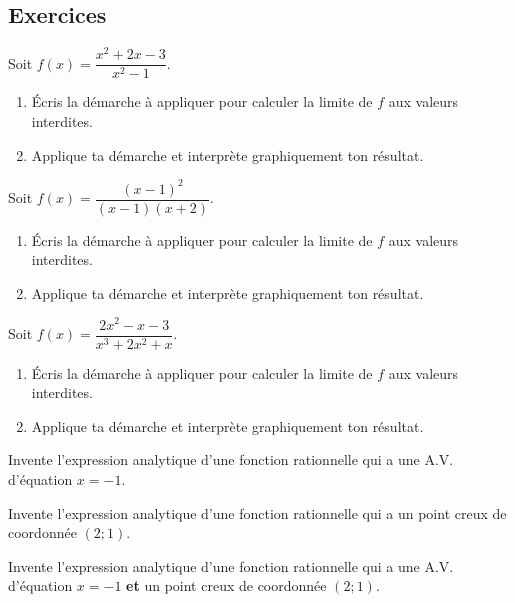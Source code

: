 \documentclass[a4paper,12pt]{report}
\begin{document}
\subsection{Exercices}
\label{sec:org7459f33}
\begin{exercice}
Soit \(f(x)=\dfrac{x^2+2x-3}{x^2-1}\).
\begin{enumerate}
\item Écris la démarche à appliquer pour calculer la limite de \(f\) aux
valeurs interdites.
\item Applique ta démarche et interprète graphiquement ton résultat.
\end{enumerate}
\label{orgfd57650}
\end{exercice}

\begin{exercice}
Soit \(f(x)=\dfrac{(x-1)^2}{(x-1)(x+2)}\).
\begin{enumerate}
\item Écris la démarche à appliquer pour calculer la limite de \(f\) aux
valeurs interdites.
\item Applique ta démarche et interprète graphiquement ton résultat.
\end{enumerate}
\label{org8c9e388}
\end{exercice}
\begin{exercice}
Soit \(f(x)=\dfrac{2x^2-x-3}{x^3+2x^2+x}\).
\begin{enumerate}
\item Écris la démarche à appliquer pour calculer la limite de \(f\) aux
valeurs interdites.
\item Applique ta démarche et interprète graphiquement ton résultat.
\end{enumerate}
\label{org43c2d77}
\end{exercice}
\begin{exercice}
Invente l'expression analytique d'une fonction rationnelle qui a une
A.V. d'équation \(x=-1\).
\end{exercice}
\begin{exercice}
Invente l'expression analytique d'une fonction rationnelle qui a un point creux
de coordonnée \((2;1)\).
\end{exercice}

\begin{exercice}
Invente l'expression analytique d'une fonction rationnelle qui a une
A.V. d'équation \(x=-1\) \textbf{et} un point creux de coordonnée \((2;1)\).
\end{exercice}
\end{document}
